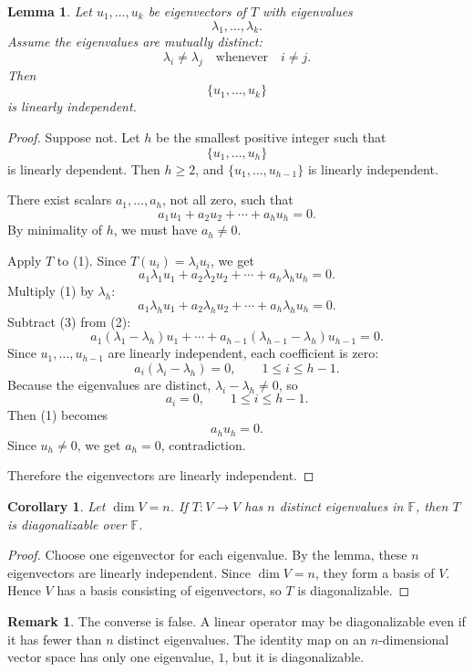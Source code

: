 \documentclass[11pt]{article}
\newcommand{\F}{\mathbb F}
\theoremstyle{definition}
\newtheorem{remark}[definition]{Remark}
\theoremstyle{plain}
\newtheorem{lemma}[definition]{Lemma}
\newtheorem{corollary}[definition]{Corollary}
\begin{document}
\begin{lemma}
Let $u_1,\dots,u_k$ be eigenvectors of $T$ with eigenvalues
\[
\lambda_1,\dots,\lambda_k.
\]
Assume the eigenvalues are mutually distinct:
\[
\lambda_i\neq\lambda_j
\quad\text{whenever}\quad i\neq j.
\]
Then
\[
\{u_1,\dots,u_k\}
\]
is linearly independent.
\end{lemma}

\begin{proof}
Suppose not.  Let $h$ be the smallest positive integer such that
\[
\{u_1,\dots,u_h\}
\]
is linearly dependent.  Then $h\geq 2$, and $\{u_1,\dots,u_{h-1}\}$ is linearly independent.

There exist scalars $a_1,\dots,a_h$, not all zero, such that
\[
a_1u_1+a_2u_2+\cdots+a_hu_h=0. \tag{1}
\]
By minimality of $h$, we must have $a_h\neq 0$.

Apply $T$ to (1).  Since $T(u_i)=\lambda_i u_i$, we get
\[
a_1\lambda_1u_1+a_2\lambda_2u_2+\cdots+a_h\lambda_hu_h=0. \tag{2}
\]
Multiply (1) by $\lambda_h$:
\[
a_1\lambda_hu_1+a_2\lambda_hu_2+\cdots+a_h\lambda_hu_h=0. \tag{3}
\]
Subtract (3) from (2):
\[
a_1(\lambda_1-\lambda_h)u_1+\cdots+a_{h-1}(\lambda_{h-1}-\lambda_h)u_{h-1}=0.
\]
Since $u_1,\dots,u_{h-1}$ are linearly independent, each coefficient is zero:
\[
a_i(\lambda_i-\lambda_h)=0,
\qquad 1\leq i\leq h-1.
\]
Because the eigenvalues are distinct, $\lambda_i-\lambda_h\neq 0$, so
\[
a_i=0,
\qquad 1\leq i\leq h-1.
\]
Then (1) becomes
\[
a_hu_h=0.
\]
Since $u_h\neq 0$, we get $a_h=0$, contradiction.

Therefore the eigenvectors are linearly independent.
\end{proof}

\begin{corollary}
Let $\dim V=n$.  If $T:V\to V$ has $n$ distinct eigenvalues in $\F$, then $T$ is diagonalizable over $\F$.
\end{corollary}

\begin{proof}
Choose one eigenvector for each eigenvalue.  By the lemma, these $n$ eigenvectors are linearly independent.  Since $\dim V=n$, they form a basis of $V$.  Hence $V$ has a basis consisting of eigenvectors, so $T$ is diagonalizable.
\end{proof}

\begin{remark}
The converse is false.  A linear operator may be diagonalizable even if it has fewer than $n$ distinct eigenvalues.  The identity map on an $n$-dimensional vector space has only one eigenvalue, $1$, but it is diagonalizable.
\end{remark}
\end{document}

